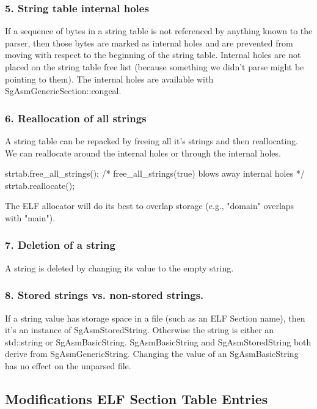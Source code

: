 \subsubsection{5. String table internal holes}

   If a sequence of bytes in a string table is not referenced by anything known to the parser, then those bytes are marked as
   internal holes and are prevented from moving with respect to the beginning of the string table. Internal holes are not
   placed on the string table free list (because something we didn't parse might be pointing to them).  The internal holes are
   available with SgAsmGenericSection::congeal.

\subsubsection{6. Reallocation of all strings}

   A string table can be repacked by freeing all it's strings and then reallocating.  We can reallocate around the internal
   holes or through the internal holes.

       strtab.free\_all\_strings();   /* free\_all\_strings(true) blows away internal holes */
       strtab.reallocate();

   The ELF allocator will do its best to overlap storage (e.g., "domain" overlaps with "main").

\subsubsection{7. Deletion of a string}

   A string is deleted by changing its value to the empty string.

\subsubsection{8. Stored strings vs. non-stored strings.}

   If a string value has storage space in a file (such as an ELF Section name), then it's an instance of
   SgAsmStoredString. Otherwise the string is either an std::string or SgAsmBasicString. SgAsmBasicString and SgAsmStoredString
   both derive from SgAsmGenericString.  Changing the value of an SgAsmBasicString has no effect on the unparsed file.

\subsection{Modifications ELF Section Table Entries}

